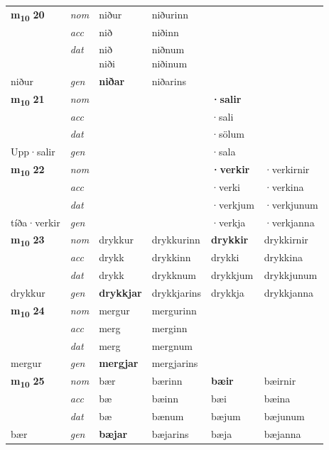 \begin{longtable}[l]{X>{\footnotesize\itshape}XXXXX}
\multirow{3}{*}{{{\textbf{m{\textsubscript{10}}} \Large{\textbf{20}}}}} & nom & niður & niðurinn & \textbf{} &  \\*
 & acc & nið & niðinn &  &  \\*
 & dat & \specialcell{nið\\ niði} & \specialcell{niðnum\\ niðinum} &  &  \\*
 {\footnotesize{niður}} & gen & \textbf{niðar} & niðarins &  &  \\
\cmidrule{1-6}

\multirow{3}{*}{{{\textbf{m{\textsubscript{10}}} \Large{\textbf{21}}}}} & nom &  &  & \textbf{·salir} &  \\*
 & acc &  &  & ·sali &  \\*
 & dat &  &  & ·sölum &  \\*
 {\footnotesize{Upp\allowbreak ·salir}} & gen & \textbf{} &  & ·sala &  \\
\cmidrule{1-6}

\multirow{3}{*}{{{\textbf{m{\textsubscript{10}}} \Large{\textbf{22}}}}} & nom &  &  & \textbf{·verkir} & ·verkirnir \\*
 & acc &  &  & ·verki & ·verkina \\*
 & dat &  &  & ·verkjum & ·verkjunum \\*
 {\footnotesize{tíða\allowbreak ·verkir}} & gen & \textbf{} &  & ·verkja & ·verkjanna \\
\cmidrule{1-6}

\multirow{3}{*}{{{\textbf{m{\textsubscript{10}}} \Large{\textbf{23}}}}} & nom & drykkur & drykkurinn & \textbf{drykkir} & drykkirnir \\*
 & acc & drykk & drykkinn & drykki & drykkina \\*
 & dat & drykk & drykknum & drykkjum & drykkjunum \\*
 {\footnotesize{drykkur}} & gen & \textbf{drykkjar} & drykkjarins & drykkja & drykkjanna \\
\cmidrule{1-6}

\multirow{3}{*}{{{\textbf{m{\textsubscript{10}}} \Large{\textbf{24}}}}} & nom & mergur & mergurinn & \textbf{} &  \\*
 & acc & merg & merginn &  &  \\*
 & dat & merg & mergnum &  &  \\*
 {\footnotesize{mergur}} & gen & \textbf{mergjar} & mergjarins &  &  \\
\cmidrule{1-6}

\multirow{3}{*}{{{\textbf{m{\textsubscript{10}}} \Large{\textbf{25}}}}} & nom & bær & bærinn & \textbf{bæir} & bæirnir \\*
 & acc & bæ & bæinn & bæi & bæina \\*
 & dat & bæ & bænum & bæjum & bæjunum \\*
 {\footnotesize{bær}} & gen & \textbf{bæjar} & bæjarins & bæja & bæjanna \\
\cmidrule{1-6}


\end{longtable}
